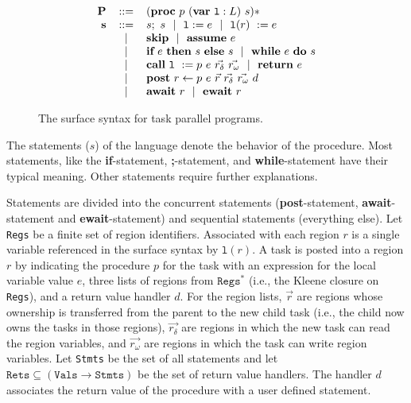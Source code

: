 \begin{figure}
  \begin{center}
\[
  \begin{array}{rcl}
\textbf{P} &::=& (\textbf{proc}~p~(\textbf{var}\ \texttt{l} : L)~s)* \\
\textbf{s} &::=& s;~s \alt \texttt{l} := e \alt \texttt{l}(r)\ := e \\
&\alt& \textbf{skip} \alt  \textbf{assume}~e \\
&\alt& \textbf{if}~e~\textbf{then}~s~\textbf{else}~s \alt \textbf{while}~e~\textbf{do}~s \\
&\alt& \textbf{call}~\texttt{l}\ := p~e~\vec{r_\delta}~\vec{r_\omega} \alt \textbf{return}~e \\
&\alt& \textbf{post}~r \leftarrow p~e~\vec{r}~\vec{r_\delta}~\vec{r_\omega}~d \\
&\alt& \textbf{await}~r \alt \textbf{ewait}~r \\
  \end{array}
\]
  \end{center}
  \caption{The surface syntax for task parallel programs.}
  \label{fig:syntax}
\end{figure}

The statements ($s$) of the language denote the behavior of the procedure. Most statements, like the \textbf{if}-statement, \textbf{;}-statement, and \textbf{while}-statement have their typical meaning. Other statements require further explanations.

Statements are divided into the concurrent statements (\textbf{post}-statement, \textbf{await}-statement and \textbf{ewait}-statement) and sequential statements (everything else).  Let \texttt{Regs} be a finite set of region identifiers. Associated with each region $r$ is a single variable referenced in the surface syntax by $\texttt{l}(r)$. A task is posted into a region $r$ by indicating the procedure $p$ for the task with an expression for the local variable value $e$, three lists of regions from $\texttt{Regs}^\ast$ (i.e., the Kleene closure on \texttt{Regs}), and a return value handler $d$. For the region lists, $\vec{r}$ are regions whose ownership is transferred from the parent to the new child task (i.e., the child now owns the tasks in those regions), $\vec{r_\delta}$ are regions in which the new task can read the region variables, and $\vec{r_\omega}$ are regions in which the task can write region variables. Let \texttt{Stmts} be the set of all statements and let $\texttt{Rets} \subseteq (\texttt{Vals} \rightarrow \texttt{Stmts})$ be the set of return value handlers. The handler $d$ associates the return value of the procedure with a user defined statement. 


